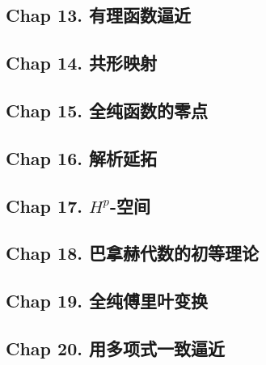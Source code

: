 \subsection{Chap 13. 有理函数逼近}

\subsection{Chap 14. 共形映射}

\subsection{Chap 15. 全纯函数的零点}

\subsection{Chap 16. 解析延拓}

\subsection{Chap 17. $H^p$-空间}

\subsection{Chap 18. 巴拿赫代数的初等理论}

\subsection{Chap 19. 全纯傅里叶变换}

\subsection{Chap 20. 用多项式一致逼近}
